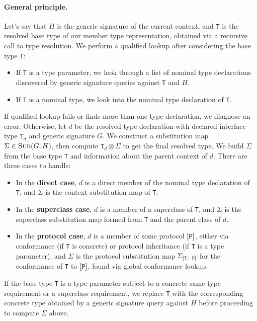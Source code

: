 \documentclass[../generics]{subfiles}
\begin{document}
\paragraph{General principle.} Let's say that $H$ is the generic signature of the current context, and \texttt{T} is the resolved base type of our member type representation, obtained via a recursive call to type resolution. We perform a qualified lookup after considering the base type \texttt{T}:
\begin{itemize}
\item If \texttt{T} is a type parameter, we look through a list of nominal type declarations discovered by generic signature queries against \texttt{T} and $H$.
\item If \texttt{T} is a nominal type, we look into the nominal type declaration of \texttt{T}.
\end{itemize}
If qualified lookup fails or finds more than one type declaration, we diagnose an error. Otherwise, let $d$ be the resolved type declaration with declared interface type $\texttt{T}_d$ and generic signature $G$. We construct a substitution map $\Sigma\in\textsc{Sub}({G, H})$, then compute $\texttt{T}_d\otimes\Sigma$ to get the final resolved type. We build $\Sigma$ from the base type \texttt{T} and information about the parent context of $d$. There are three cases to handle:
\begin{itemize}
\item In the \textbf{direct case}, $d$ is a direct member of the nominal type declaration of \texttt{T}, and $\Sigma$ is the context substitution map of \texttt{T}.
\item In the \textbf{superclass case}, $d$ is a member of a superclass of \texttt{T}, and $\Sigma$ is the superclass substitution map formed from \texttt{T} and the parent class of $d$.
\item In the \textbf{protocol case}, $d$ is a member of some protocol $[\texttt{P}]$, either via conformance (if \texttt{T} is concrete) or protocol inheritance (if \texttt{T} is a type parameter), and $\Sigma$ is the protocol substitution map $\Sigma_{[\texttt{T:~P}]}$ for the conformance of \texttt{T} to $[\texttt{P}]$, found via global conformance lookup.
\end{itemize}
If the base type \texttt{T} is a type parameter subject to a concrete same-type requirement or a superclass requirement, we replace \texttt{T} with the corresponding concrete type obtained by a generic signature query against $H$ before proceeding to compute $\Sigma$ above.
\end{document}
